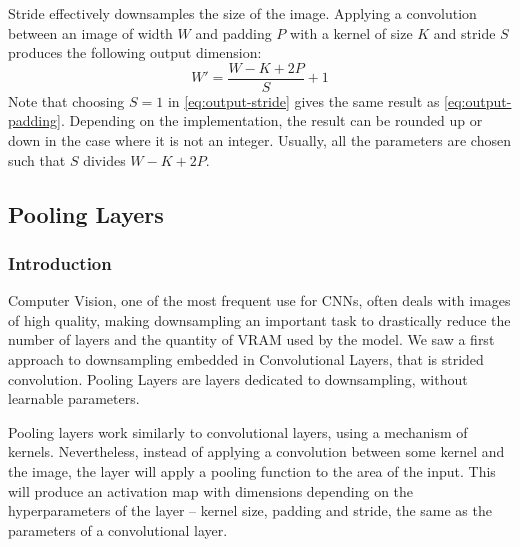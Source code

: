 Stride effectively downsamples the size of the image. Applying a convolution between an image of width $W$ and padding $P$ with a kernel of size $K$ and stride $S$ produces the following output dimension:
\begin{equation}
    \label{eq:output-stride}
    W'=\frac{W-K+2P}{S}+1
\end{equation}
Note that choosing $S=1$ in \eqref{eq:output-stride} gives the same result as \eqref{eq:output-padding}. Depending on the implementation, the result can be rounded up or down in the case where it is not an integer. Usually, all the parameters are chosen such that $S$ divides $W-K+2P$.

\subsection{Pooling Layers}
\subsubsection{Introduction}
Computer Vision, one of the most frequent use for CNNs, often deals with images of high quality, making downsampling an important task to drastically reduce the number of layers and the quantity of VRAM used by the model. We saw a first approach to downsampling embedded in Convolutional Layers, that is strided convolution. Pooling Layers are layers dedicated to downsampling, without learnable parameters.

Pooling layers work similarly to convolutional layers, using a mechanism of kernels. Nevertheless, instead of applying a convolution between some kernel and the image, the layer will apply a pooling function to the area of the input. This will produce an activation map with dimensions depending on the hyperparameters of the layer -- kernel size, padding and stride, the same as the parameters of a convolutional layer.

